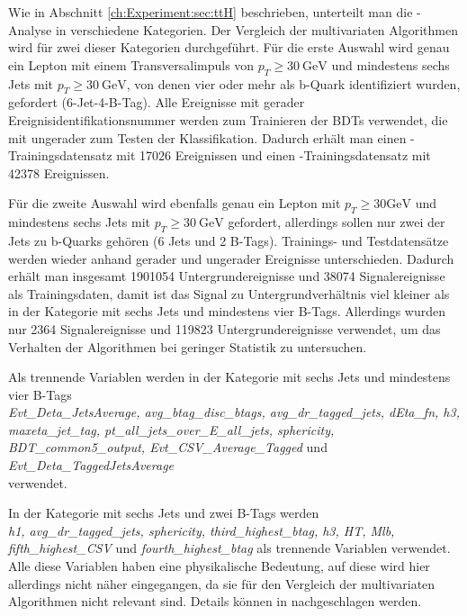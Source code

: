 Wie in Abschnitt \ref{ch:Experiment:sec:ttH} beschrieben, unterteilt man die \ttH-Analyse in verschiedene Kategorien. Der Vergleich der multivariaten Algorithmen wird f\"ur zwei dieser Kategorien durchgef\"uhrt. F\"ur die erste Auswahl wird genau ein Lepton mit einem Transversalimpuls von $p_T\geq \num{30}~\si{\giga\electronvolt}$ und mindestens sechs Jets mit $p_T\geq \num{30}~\si{\giga\electronvolt}$, von denen vier oder mehr als b-Quark identifiziert wurden, gefordert (6-Jet-4-B-Tag). Alle Ereignisse mit gerader Ereignisidentifikationsnummer werden zum Trainieren der BDTs verwendet, die mit ungerader zum Testen der Klassifikation. Dadurch erh\"alt man einen \ttH-Trainingsdatensatz mit 17026 Ereignissen und einen \ttb-Trainingsdatensatz mit 42378 Ereignissen.

F\"ur die zweite Auswahl wird ebenfalls genau ein Lepton mit $p_T\geq \num{30} \si{\giga\electronvolt}$ und mindestens sechs Jets mit $p_T\geq \num{30}~\si{\giga\electronvolt}$ gefordert, allerdings sollen nur zwei der Jets zu b-Quarks geh\"oren (6 Jets und 2 B-Tags). Trainings- und Testdatens\"atze werden wieder anhand gerader und ungerader Ereignisse unterschieden. Dadurch erh\"alt man insgesamt 1901054 Untergrundereignisse und 38074 Signalereignisse als Trainingsdaten, damit ist das Signal zu Untergrundverh\"altnis viel kleiner als in der Kategorie mit sechs Jets und mindestens vier B-Tags. Allerdings wurden nur 2364 Signalereignisse und 119823 Untergrundereignisse verwendet, um das Verhalten der Algorithmen bei geringer Statistik zu untersuchen. 

Als trennende Variablen werden in der Kategorie mit sechs Jets und mindestens vier B-Tags\\
{\it Evt\_Deta\_JetsAverage, avg\_btag\_disc\_btags, avg\_dr\_tagged\_jets, dEta\_fn, h3, maxeta\_jet\_tag, pt\_all\_jets\_over\_E\_all\_jets, sphericity, BDT\_common5\_output, Evt\_CSV\_Average\_Tagged} und {\it Evt\_Deta\_TaggedJetsAverage}\\verwendet.

In der Kategorie mit sechs Jets und zwei B-Tags werden \\ {\it h1, avg\_dr\_tagged\_jets, sphericity, third\_highest\_btag, h3, HT, Mlb, fifth\_highest\_CSV} und {\it fourth\_highest\_btag} als trennende Variablen verwendet.\\
Alle diese Variablen haben eine physikalische Bedeutung, auf diese wird hier allerdings nicht n\"aher eingegangen, da sie f\"ur den Vergleich der multivariaten Algorithmen nicht relevant sind. Details k\"onnen in \cite{CMS-PAS-HIG-16-004} nachgeschlagen werden.


